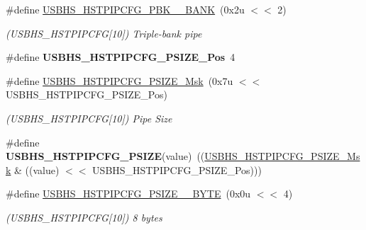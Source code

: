 \begin{DoxyCompactItemize}
\mbox{\label{group__SAME70__USBHS_gacf2d01a41e4d6f044a24f7b44f64a1f6}} 
\#define \mbox{\hyperlink{group__SAME70__USBHS_gacf2d01a41e4d6f044a24f7b44f64a1f6}{U\+S\+B\+H\+S\+\_\+\+H\+S\+T\+P\+I\+P\+C\+F\+G\+\_\+\+P\+B\+K\+\_\+\_\+\+B\+A\+NK}}~(0x2u $<$$<$ 2)
\begin{DoxyCompactList}\small\item\em (U\+S\+B\+H\+S\+\_\+\+H\+S\+T\+P\+I\+P\+C\+FG\mbox{[}10\mbox{]}) Triple-\/bank pipe \end{DoxyCompactList}\item 
\mbox{\label{group__SAME70__USBHS_ga684a43caf3f329a82c19b2d39750e3ff}} 
\#define {\bfseries U\+S\+B\+H\+S\+\_\+\+H\+S\+T\+P\+I\+P\+C\+F\+G\+\_\+\+P\+S\+I\+Z\+E\+\_\+\+Pos}~4
\item 
\mbox{\label{group__SAME70__USBHS_ga77f213ac27c22e9ca19df137d452a69f}} 
\#define \mbox{\hyperlink{group__SAME70__USBHS_ga77f213ac27c22e9ca19df137d452a69f}{U\+S\+B\+H\+S\+\_\+\+H\+S\+T\+P\+I\+P\+C\+F\+G\+\_\+\+P\+S\+I\+Z\+E\+\_\+\+Msk}}~(0x7u $<$$<$ U\+S\+B\+H\+S\+\_\+\+H\+S\+T\+P\+I\+P\+C\+F\+G\+\_\+\+P\+S\+I\+Z\+E\+\_\+\+Pos)
\begin{DoxyCompactList}\small\item\em (U\+S\+B\+H\+S\+\_\+\+H\+S\+T\+P\+I\+P\+C\+FG\mbox{[}10\mbox{]}) Pipe Size \end{DoxyCompactList}\item 
\mbox{\label{group__SAME70__USBHS_gac122951619bc7c68829b9d6fd843dc31}} 
\#define {\bfseries U\+S\+B\+H\+S\+\_\+\+H\+S\+T\+P\+I\+P\+C\+F\+G\+\_\+\+P\+S\+I\+ZE}(value)~((\mbox{\hyperlink{group__SAMV71__USBHS_ga77f213ac27c22e9ca19df137d452a69f}{U\+S\+B\+H\+S\+\_\+\+H\+S\+T\+P\+I\+P\+C\+F\+G\+\_\+\+P\+S\+I\+Z\+E\+\_\+\+Msk}} \& ((value) $<$$<$ U\+S\+B\+H\+S\+\_\+\+H\+S\+T\+P\+I\+P\+C\+F\+G\+\_\+\+P\+S\+I\+Z\+E\+\_\+\+Pos)))
\item 
\mbox{\label{group__SAME70__USBHS_gaa4925e30bac220fa554147b9d58ab408}} 
\#define \mbox{\hyperlink{group__SAME70__USBHS_gaa4925e30bac220fa554147b9d58ab408}{U\+S\+B\+H\+S\+\_\+\+H\+S\+T\+P\+I\+P\+C\+F\+G\+\_\+\+P\+S\+I\+Z\+E\+\_\+\_\+\+B\+Y\+TE}}~(0x0u $<$$<$ 4)
\begin{DoxyCompactList}\small\item\em (U\+S\+B\+H\+S\+\_\+\+H\+S\+T\+P\+I\+P\+C\+FG\mbox{[}10\mbox{]}) 8 bytes \end{DoxyCompactList}\item 

\end{DoxyCompactItemize}
